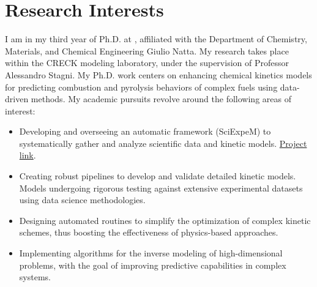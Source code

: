 \section{\sc Research Interests}

%
%
%


I am in my third year of Ph.D. at \polimi, affiliated with the Department of
Chemistry, Materials, and Chemical Engineering Giulio Natta. My research takes place
within the CRECK modeling laboratory, under the supervision of Professor Alessandro
Stagni. My Ph.D. work centers on enhancing chemical kinetics models for predicting
combustion and pyrolysis behaviors of complex fuels using data-driven methods.
My academic pursuits revolve around the following areas of interest:

\begin{itemize}
   \item Developing and overseeing an automatic framework (SciExpeM) to systematically
      gather and analyze scientific data and kinetic models.
      \href{https://sciexpem.polimi.it}{Project link}.

   \item Creating robust pipelines to develop and validate detailed kinetic models.
      Models undergoing rigorous testing against extensive experimental datasets using
      data science methodologies.

   \item Designing automated routines to simplify the optimization of complex kinetic
      schemes, thus boosting the effectiveness of physics-based approaches.

   \item Implementing algorithms for the inverse modeling of high-dimensional problems,
      with the goal of improving predictive capabilities in complex systems.
\end{itemize}
